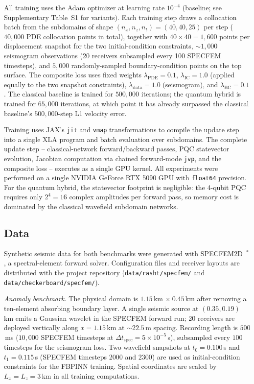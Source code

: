 \documentclass[11pt,a4paper]{article}
\newcommand{\newcite}[1]{\textcolor{todoRed}{$^{\ast}$}\citep{#1}}
\begin{document}
All training uses the Adam optimizer at learning rate $10^{-4}$ (baseline; see Supplementary Table~S1 for variants). Each training step draws a collocation batch from the subdomains of shape $(n_x, n_z, n_t) = (40,40,25)$ per step ($40{,}000$ PDE collocation points in total), together with $40\!\times\!40 = 1{,}600$ points per displacement snapshot for the two initial-condition constraints, $\sim$$1{,}000$ seismogram observations (20 receivers subsampled every 100 SPECFEM timesteps), and $5{,}000$ randomly-sampled boundary-condition points on the top surface. The composite loss uses fixed weights $\lambda_\text{PDE} = 0.1$, $\lambda_\text{IC} = 1.0$ (applied equally to the two snapshot constraints), $\lambda_\text{data} = 1.0$ (seismogram), and $\lambda_\text{BC} = 0.1$. The classical baseline is trained for $500{,}000$ iterations; the quantum hybrid is trained for $65{,}000$ iterations, at which point it has already surpassed the classical baseline's $500{,}000$-step L1 velocity error.

Training uses JAX's \texttt{jit} and \texttt{vmap} transformations to compile the update step into a single XLA program and batch evaluation over subdomains. The complete update step -- classical-network forward/backward passes, PQC statevector evolution, Jacobian computation via chained forward-mode \texttt{jvp}, and the composite loss -- executes as a single GPU kernel. All experiments were performed on a single NVIDIA GeForce RTX 5090 GPU with \texttt{float64} precision. For the quantum hybrid, the statevector footprint is negligible: the 4-qubit PQC requires only $2^4 = 16$ complex amplitudes per forward pass, so memory cost is dominated by the classical wavefield subdomain networks.

\subsection{Data}
\label{sec:methods_data}

Synthetic seismic data for both benchmarks were generated with SPECFEM2D~\newcite{komatitsch1998spectral}, a spectral-element forward solver. Configuration files and receiver layouts are distributed with the project repository (\texttt{data/rasht/specfem/} and \texttt{data/checkerboard/specfem/}).

\textit{Anomaly benchmark.}
The physical domain is $1.15$\,km $\times\ 0.45$\,km after removing a ten-element absorbing boundary layer. A single seismic source at $(0.35, 0.19)$\,km emits a Gaussian wavelet in the SPECFEM forward run; 20 receivers are deployed vertically along $x = 1.15$\,km at $\sim$$22.5$\,m spacing. Recording length is $500$\,ms ($10{,}000$ SPECFEM timesteps at $\Delta t_\text{spec} = 5\times 10^{-5}$\,s), subsampled every $100$ timesteps for the seismogram loss. Two wavefield snapshots at $t_0 = 0.100$\,s and $t_1 = 0.115$\,s (SPECFEM timesteps 2000 and 2300) are used as initial-condition constraints for the FBPINN training. Spatial coordinates are scaled by $L_x = L_z = 3$\,km in all training computations.
\end{document}
